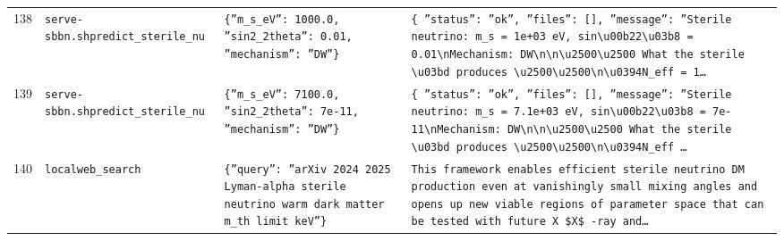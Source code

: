 \documentclass[11pt,a4paper]{article}
\begin{document}
\begin{longtable}{@{}p{}p{}p{}p{}@{}}
138 & \texttt{serve-sbbn.sh}\newline\texttt{predict\_\allowbreak{}sterile\_\allowbreak{}nu} & \texttt{\{''m\_\allowbreak{}s\_\allowbreak{}eV'':\allowbreak{} 1000.0,\allowbreak{} ''sin2\_\allowbreak{}2theta'':\allowbreak{} 0.01,\allowbreak{} ''mechanism'':\allowbreak{} ''DW''\}\allowbreak{}} & \texttt{\{   ''status'':\allowbreak{} ''ok'',\allowbreak{}   ''files'':\allowbreak{} []\allowbreak{},\allowbreak{}   ''message'':\allowbreak{} ''Sterile neutrino:\allowbreak{} m\_\allowbreak{}s =\allowbreak{} 1e+03 eV,\allowbreak{} sin\textbackslash{}\allowbreak{}u00b22\textbackslash{}\allowbreak{}u03b8 =\allowbreak{} 0.01\textbackslash{}\allowbreak{}nMechanism:\allowbreak{} DW\textbackslash{}\allowbreak{}n\textbackslash{}\allowbreak{}n\textbackslash{}\allowbreak{}u2500\textbackslash{}\allowbreak{}u2500 What the sterile \textbackslash{}\allowbreak{}u03bd produces \textbackslash{}\allowbreak{}u2500\textbackslash{}\allowbreak{}u2500\textbackslash{}\allowbreak{}n\textbackslash{}\allowbreak{}u0394N\_\allowbreak{}eff =\allowbreak{} 1\ldots{}\allowbreak{}} \\
139 & \texttt{serve-sbbn.sh}\newline\texttt{predict\_\allowbreak{}sterile\_\allowbreak{}nu} & \texttt{\{''m\_\allowbreak{}s\_\allowbreak{}eV'':\allowbreak{} 7100.0,\allowbreak{} ''sin2\_\allowbreak{}2theta'':\allowbreak{} 7e-11,\allowbreak{} ''mechanism'':\allowbreak{} ''DW''\}\allowbreak{}} & \texttt{\{   ''status'':\allowbreak{} ''ok'',\allowbreak{}   ''files'':\allowbreak{} []\allowbreak{},\allowbreak{}   ''message'':\allowbreak{} ''Sterile neutrino:\allowbreak{} m\_\allowbreak{}s =\allowbreak{} 7.1e+03 eV,\allowbreak{} sin\textbackslash{}\allowbreak{}u00b22\textbackslash{}\allowbreak{}u03b8 =\allowbreak{} 7e-11\textbackslash{}\allowbreak{}nMechanism:\allowbreak{} DW\textbackslash{}\allowbreak{}n\textbackslash{}\allowbreak{}n\textbackslash{}\allowbreak{}u2500\textbackslash{}\allowbreak{}u2500 What the sterile \textbackslash{}\allowbreak{}u03bd produces \textbackslash{}\allowbreak{}u2500\textbackslash{}\allowbreak{}u2500\textbackslash{}\allowbreak{}n\textbackslash{}\allowbreak{}u0394N\_\allowbreak{}eff \ldots{}\allowbreak{}} \\
140 & \texttt{local}\newline\texttt{web\_\allowbreak{}search} & \texttt{\{''query'':\allowbreak{} ''arXiv 2024 2025 Lyman-alpha sterile neutrino warm dark matter m\_\allowbreak{}th limit keV''\}\allowbreak{}} & \texttt{This framework enables efficient sterile neutrino DM production even at vanishingly small mixing angles and opens up new viable regions of parameter space that can be tested with future X \$X\$ -ray and\ldots{}\allowbreak{}} \\

\end{longtable}
\end{document}

